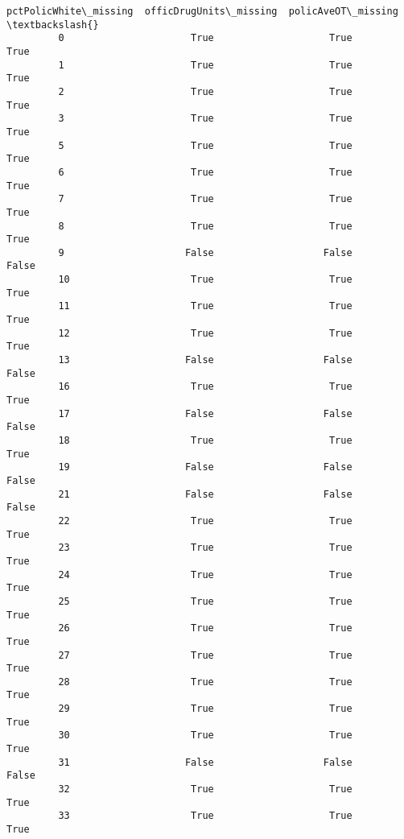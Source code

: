\documentclass[11pt]{llncs}
\begin{document}
\begin{Verbatim}[commandchars=\\\{\}]
               pctPolicWhite\_missing  officDrugUnits\_missing  policAveOT\_missing  \textbackslash{}
         0                      True                    True                True   
         1                      True                    True                True   
         2                      True                    True                True   
         3                      True                    True                True   
         5                      True                    True                True   
         6                      True                    True                True   
         7                      True                    True                True   
         8                      True                    True                True   
         9                     False                   False               False   
         10                     True                    True                True   
         11                     True                    True                True   
         12                     True                    True                True   
         13                    False                   False               False   
         16                     True                    True                True   
         17                    False                   False               False   
         18                     True                    True                True   
         19                    False                   False               False   
         21                    False                   False               False   
         22                     True                    True                True   
         23                     True                    True                True   
         24                     True                    True                True   
         25                     True                    True                True   
         26                     True                    True                True   
         27                     True                    True                True   
         28                     True                    True                True   
         29                     True                    True                True   
         30                     True                    True                True   
         31                    False                   False               False   
         32                     True                    True                True   
         33                     True                    True                True   

\end{Verbatim}
\end{document}
